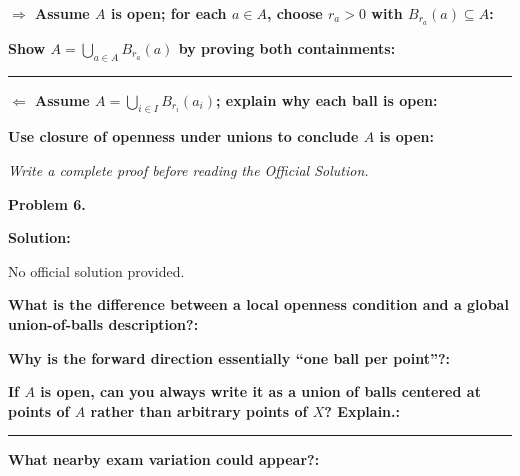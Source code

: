 \documentclass[12pt]{article}
\newcommand{\fillfield}[1]{%
  \par\noindent\textbf{#1:}\enspace\hrulefill\par\vspace{3pt}%
}
\newcommand{\fillfieldlong}[1]{%
  \par\noindent\textbf{#1:}\par\vspace{1.5cm}%
  \noindent\rule{\linewidth}{0.35pt}\par\vspace{4pt}%
}
\newcommand{\writespace}[1]{\vspace{#1}}
\begin{document}
\newpage

\begin{tcolorbox}[
  enhanced, breakable,
  colback  = pass4purple,
  colframe = purple!55!black,
  fonttitle = \bfseries,
  title = {Pass 4 \enspace\textbf{--}\enspace Skeleton Proof}
]
\noindent\textbf{$\Longrightarrow$ Assume $A$ is open; for each $a\in A$, choose $r_a>0$ with $B_{r_a}(a)\subseteq A$:}\par
\writespace{1.5cm}
\noindent\textbf{Show $A=\bigcup_{a\in A} B_{r_a}(a)$ by proving both containments:}\par
\writespace{1.8cm}

\noindent\rule{\linewidth}{0.4pt}\vspace{2pt}

\noindent\textbf{$\Longleftarrow$ Assume $A=\bigcup_{i\in I} B_{r_i}(a_i)$; explain why each ball is open:}\par
\writespace{1.2cm}
\noindent\textbf{Use closure of openness under unions to conclude $A$ is open:}\par
\writespace{1.0cm}
\end{tcolorbox}

\newpage

\begin{tcolorbox}[
  enhanced, breakable,
  colback  = pass5gray,
  colframe = black!38,
  fonttitle = \bfseries,
  title = {Pass 5 \enspace\textbf{--}\enspace Full Proof Attempt}
]
\small\itshape Write a complete proof before reading the Official Solution.\par
\normalfont\normalsize
\writespace{19cm}
\end{tcolorbox}

\newpage

\begin{tcolorbox}[
  enhanced, breakable,
  colback  = solgreen,
  colframe = green!45!black,
  fonttitle = \bfseries,
  title = {\textsc{Official Solution}\hfill Homework 8 -- Selected Solutions}
]
\textbf{Problem 6.}

\medskip\textbf{Solution:}

\medskip
No official solution provided.
\end{tcolorbox}

\bigskip

\begin{tcolorbox}[
  enhanced, breakable,
  colback  = reflectcyan,
  colframe = cyan!55!black,
  fonttitle = \bfseries,
  title = {\textsc{Reflection \& Variation}}
]
\fillfield{What is the difference between a local openness condition and a global union-of-balls description?}
\fillfield{Why is the forward direction essentially ``one ball per point''?}
\fillfieldlong{If $A$ is open, can you always write it as a union of balls centered at points of $A$ rather than arbitrary points of $X$? Explain.}
\fillfield{What nearby exam variation could appear?}
\end{tcolorbox}
\end{document}
